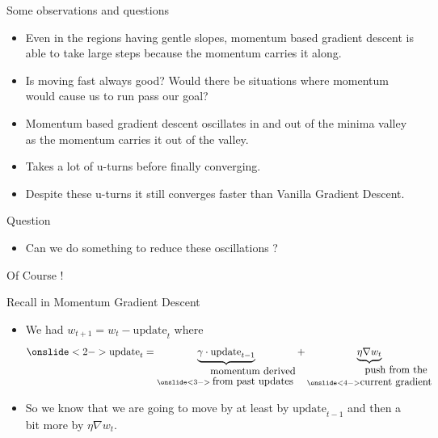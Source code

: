 \documentclass[10pt, aspectratio=169]{beamer}
\begin{document}
\begin{frame}
\begin{block}{Some observations and questions}
\begin{itemize}
\item<1-> Even in the regions having gentle slopes, momentum based gradient descent is able to take large steps because the momentum carries it along.
\item<2-> Is moving fast always good? Would there be situations where momentum would cause us to run pass our goal?
\end{itemize}
\end{block}
\end{frame}

\begin{frame}
\begin{itemize}
\item<1-> Momentum based gradient descent oscillates in and out of the minima valley as the momentum carries it out of the valley.
\item<2-> Takes a lot of u-turns before finally converging.
\item<3-> Despite these u-turns it still converges faster than Vanilla Gradient Descent.
\end{itemize}
\end{frame}


\begin{frame}
\begin{block}{Question}
\begin{itemize}
\item<1-> Can we do something to reduce these oscillations ?
\end{itemize}
\leftpointright \hspace{0.1cm} Of Course !
\end{block}
\end{frame}

\begin{frame}
\begin{block}{Recall in Momentum Gradient Descent}
\begin{itemize}
\item<1-> We had $w_{t+1} = w_t - \text{update}_t$ where
$$\onslide<2->{\text{update}_t = \underbrace{\gamma \cdot \text{update}_{t-1}}_{\onslide<3->{\shortstack{momentum derived \\ from past updates}}} + \underbrace{\eta \nabla w_t}_{\onslide<4->{\shortstack{push from the \\ current gradient}}}}$$
\item<5-> So we know that we are going to move by at least by $\text{update}_{t-1}$ and then a bit more by $\eta \nabla w_t$.
\end{itemize}
\end{block}
\end{frame}
\end{document}
